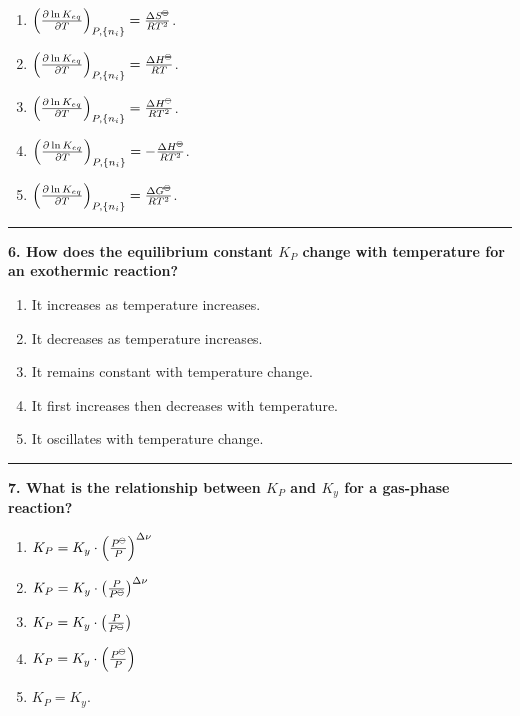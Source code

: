 \documentclass[
  9pt,
]{extbook}
\providecommand{\tightlist}{%
  \setlength{\itemsep}{0pt}\setlength{\parskip}{0pt}}
\theoremstyle{definition}
\theoremstyle{definition}
\theoremstyle{definition}
\theoremstyle{definition}
\theoremstyle{remark}
\begin{document}
\begin{enumerate}
\def\labelenumi{\alph{enumi}.}
\tightlist
\item
  \(\left(\frac{\partial \ln K_{eq}}{\partial T}\right)_{P,\{n_i\}} = \frac{\Delta S^{{-\kern-6pt{\ominus}\kern-6pt-}}}{RT^2}\).
\item
  \(\left(\frac{\partial \ln K_{eq}}{\partial T}\right)_{P,\{n_i\}} = \frac{\Delta H^{{-\kern-6pt{\ominus}\kern-6pt-}}}{RT}\).
\item
  \(\left(\frac{\partial \ln K_{eq}}{\partial T}\right)_{P,\{n_i\}} = \frac{\Delta H^{{-\kern-6pt{\ominus}\kern-6pt-}}}{RT^2}\).
\item
  \(\left(\frac{\partial \ln K_{eq}}{\partial T}\right)_{P,\{n_i\}} = -\frac{\Delta H^{{-\kern-6pt{\ominus}\kern-6pt-}}}{RT^2}\).
\item
  \(\left(\frac{\partial \ln K_{eq}}{\partial T}\right)_{P,\{n_i\}} = \frac{\Delta G^{{-\kern-6pt{\ominus}\kern-6pt-}}}{RT^2}\).
\end{enumerate}

\begin{center}\rule{0.5\linewidth}{0.5pt}\end{center}

\textbf{6. How does the equilibrium constant \(K_P\) change with temperature for an exothermic reaction?}

\begin{enumerate}
\def\labelenumi{\alph{enumi}.}
\tightlist
\item
  It increases as temperature increases.
\item
  It decreases as temperature increases.
\item
  It remains constant with temperature change.
\item
  It first increases then decreases with temperature.
\item
  It oscillates with temperature change.
\end{enumerate}

\begin{center}\rule{0.5\linewidth}{0.5pt}\end{center}

\textbf{7. What is the relationship between \(K_P\) and \(K_y\) for a gas-phase reaction?}

\begin{enumerate}
\def\labelenumi{\alph{enumi}.}
\tightlist
\item
  \(K_P = K_y \cdot \left(\frac{P^{{-\kern-6pt{\ominus}\kern-6pt-}}}{P}\right)^{\Delta \nu}\)
\item
  \(K_P = K_y \cdot \left(\frac{P}{P^{{-\kern-6pt{\ominus}\kern-6pt-}}}\right)^{\Delta \nu}\)
\item
  \(K_P = K_y \cdot \left(\frac{P}{P^{{-\kern-6pt{\ominus}\kern-6pt-}}}\right)\)
\item
  \(K_P = K_y \cdot \left(\frac{P^{{-\kern-6pt{\ominus}\kern-6pt-}}}{P}\right)\)
\item
  \(K_P = K_y\).
\end{enumerate}
\end{document}
